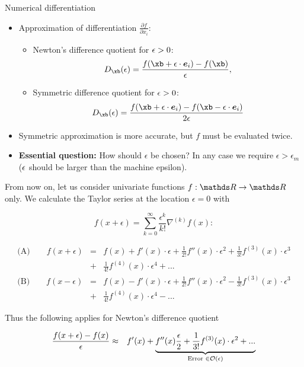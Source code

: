   \begin{vbframe}{Numerical differentiation}
  \begin{itemize}
  \item Approximation of differentiation $\frac{\partial f}{\partial
  x_{i}}$:
  \begin{itemize}
    \item Newton's difference quotient for $\epsilon > 0$: 
    $$
    D_\xb(\epsilon) = \frac{f(\xb + \epsilon\cdot \bm{e}_i) -
    f(\xb)}{\epsilon}, 
    $$
    \item Symmetric difference quotient for $\epsilon > 0$: 
    $$
    D_\xb(\epsilon) = \frac{f(\xb + \epsilon\cdot \bm{e}_i) - f(\xb - \epsilon
    \cdot \bm{e}_{i})}{2\epsilon}
    $$
  \end{itemize}
  \item Symmetric approximation is more accurate, but $f$ must be evaluated twice.
  \item \textbf{Essential question:} How should $\epsilon$ be chosen? In any case we require $\epsilon > \epsilon_{m}$ ($\epsilon$ should be larger than the machine epsilon).
  \end{itemize}
  
  \framebreak
  
  From now on, let us consider univariate functions $f: \R \to \R$ only. We calculate the Taylor series at the location $\epsilon = 0$ with
  
  $$
    f(x + \epsilon) = \sum_{k=0}^\infty \frac{\epsilon^k}{k!} \nabla^{(k)} f(x):
  $$
  
  \begin{eqnarray*}
  \text{(A)} \qquad f(x + \epsilon) &=& f(x) + f'(x) \cdot \epsilon + \frac{1}{2 !}f''(x)\cdot\epsilon^2 + \frac{1}{3 !}f^{(3)}(x)\cdot\epsilon^3 \\ &+& \frac{1}{4 !}f^{(4)}(x)\cdot\epsilon^4 + ... \\
  \text{(B)} \qquad  f(x - \epsilon) &=& f(x) - f'(x) \cdot \epsilon + \frac{1}{2 !}f''(x)\cdot\epsilon^2 - \frac{1}{3 !}f^{(3)}(x)\cdot\epsilon^3 \\ &+& \frac{1}{4 !}f^{(4)}(x)\cdot\epsilon^4 - ...
  \end{eqnarray*}
  
  \framebreak
  
  Thus the following applies for Newton's difference quotient
  
  \begin{footnotesize}
  \begin{eqnarray*}
  \frac{f(x + \epsilon) - f(x)}{\epsilon} &\approx&
  f\!\,'(x) +
  \underbrace{f\!\,''(x)\frac{\epsilon}{2} + \frac{1}{3 !}f^{(3)}(x)\cdot\epsilon^2 + ... }_{\text{Error } \in \mathcal{O}(\epsilon)}
  \end{eqnarray*}
  \end{footnotesize}
  

\end{vbframe}
